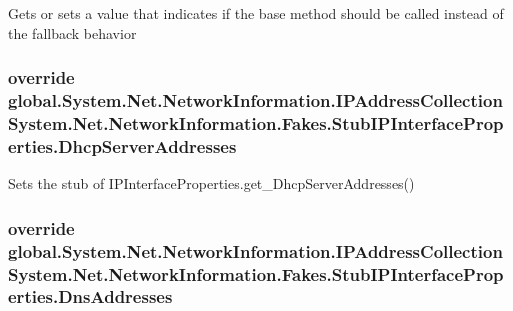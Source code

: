 Gets or sets a value that indicates if the base method should be called instead of the fallback behavior

\hypertarget{class_system_1_1_net_1_1_network_information_1_1_fakes_1_1_stub_i_p_interface_properties_a8738880519e8302091d8016cb5fac4e8}{
\subsubsection[{Dhcp\-Server\-Addresses}]{\setlength{\rightskip}{0pt plus 5cm}override global.\-System.\-Net.\-Network\-Information.\-I\-P\-Address\-Collection System.\-Net.\-Network\-Information.\-Fakes.\-Stub\-I\-P\-Interface\-Properties.\-Dhcp\-Server\-Addresses\hspace{0.3cm}{\ttfamily [get]}}}\label{class_system_1_1_net_1_1_network_information_1_1_fakes_1_1_stub_i_p_interface_properties_a8738880519e8302091d8016cb5fac4e8}


Sets the stub of I\-P\-Interface\-Properties.\-get\-\_\-\-Dhcp\-Server\-Addresses()

\hypertarget{class_system_1_1_net_1_1_network_information_1_1_fakes_1_1_stub_i_p_interface_properties_a334e676848990ebf125fc5e9c65de0d0}{
\subsubsection[{Dns\-Addresses}]{\setlength{\rightskip}{0pt plus 5cm}override global.\-System.\-Net.\-Network\-Information.\-I\-P\-Address\-Collection System.\-Net.\-Network\-Information.\-Fakes.\-Stub\-I\-P\-Interface\-Properties.\-Dns\-Addresses\hspace{0.3cm}{\ttfamily [get]}}}\label{class_system_1_1_net_1_1_network_information_1_1_fakes_1_1_stub_i_p_interface_properties_a334e676848990ebf125fc5e9c65de0d0}


